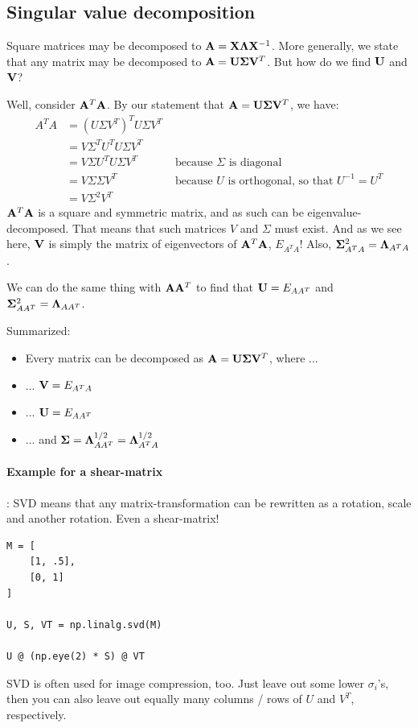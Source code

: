 \subsection{Singular value decomposition}
Square matrices may be decomposed to $\mathbf{A} = \mathbf{X} \mathbf{\Lambda} \mathbf{X}^{-1}$.
More generally, we state that any matrix may be decomposed to $\mathbf{A} = \mathbf{U} \mathbf{\Sigma} \mathbf{V}^T$.
But how do we find $\mathbf{U}$ and $\mathbf{V}$?

Well, consider $\mathbf{A}^T\mathbf{A}$.
By our statement that $\mathbf{A} = \mathbf{U} \mathbf{\Sigma} \mathbf{V}^T$, we have:
\begin{equation}
    \begin{aligned}
        A^TA    &= ( U \Sigma V^T )^T U \Sigma V^T & \\
                &= V \Sigma^T U^T U \Sigma V^T & \\
                &= V \Sigma U^T U \Sigma V^T & \text { because $\Sigma$ is diagonal} \\
                &= V \Sigma \Sigma V^T & \text{ because $U$ is orthogonal, so that $U^{-1} = U^T$} \\
                &= V \Sigma^2 V^T
    \end{aligned}
\end{equation}
$\mathbf{A}^T\mathbf{A}$ is a square and symmetric matrix, and as such can be eigenvalue-decomposed. That means that such matrices $V$ and $\Sigma$ must exist. And as we see here, $\mathbf{V}$ is simply the matrix of eigenvectors of $\mathbf{A}^T\mathbf{A}$, $E_{A^TA}$!
Also, $\mathbf{\Sigma}^2_{A^TA} = \mathbf{\Lambda}_{A^TA}$.

We can do the same thing with $\mathbf{A}\mathbf{A}^T$ to find that $\mathbf{U} = E_{AA^T}$ and $\mathbf{\Sigma}^2_{AA^T} = \mathbf{\Lambda}_{AA^T}$.

Summarized:
\begin{itemize}
    \item Every matrix can be decomposed as $\mathbf{A} = \mathbf{U} \mathbf{\Sigma} \mathbf{V}^T$, where ...
    \item ... $\mathbf{V} = E_{A^TA}$
    \item ... $\mathbf{U} = E_{AA^T}$
    \item ... and $\mathbf{\Sigma} = \mathbf{\Lambda}^{1/2}_{AA^T} = \mathbf{\Lambda}^{1/2}_{A^TA}$
\end{itemize}



\paragraph{Example for a shear-matrix}: SVD means that any matrix-transformation can be rewritten as a rotation, scale and another rotation. Even a shear-matrix!
\begin{lstlisting}
M = [
    [1, .5],
    [0, 1]
]

U, S, VT = np.linalg.svd(M)

U @ (np.eye(2) * S) @ VT
\end{lstlisting}
SVD is often used for image compression, too. Just leave out some lower $\sigma_i$'s, then you can also leave out equally many columns / rows of $U$ and $V^T$, respectively.


